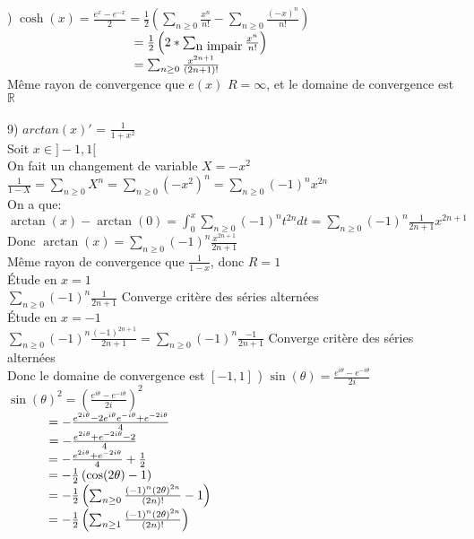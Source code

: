 \documentclass{article}
\newcommand\tab[1][1cm]{\hspace*{#1}}
\begin{document}
\newpage
{}) $\cosh(x) =  \frac{e^{x} - e^{-x}}{2} = \frac{1}{2} \left(\sum_{n \geq 0} \frac{x^n}{n!} - \sum_{n \geq 0} \frac{(-x)^n}{n!}\right)$\\
$\tab[3.55cm] = \frac{1}{2} \left(2 * \sum_{\mbox{n impair}} \frac{x^n}{n!} \right)$\\
$\tab[3.55cm] = \sum_{n \geq 0} \frac{x^{2n + 1}}{{(2n + 1)}!}$\\
Même rayon de convergence que $e(x)$ $R = \infty$, et le domaine de convergence est $\mathbb{R}$\\
\\
9) $arctan(x)'$ = $\frac{1}{1 + x^2}$\\
Soit $x \in ]-1, 1[$\\
On fait un changement de variable $X = -x^2$\\
$\frac{1}{1 - X} = \sum_{n \geq 0} X^n = \sum_{n \geq 0} (-x^2)^n = \sum_{n \geq 0} (-1)^n x^{2n}$\\
On a que: $\arctan(x) - \arctan(0) = \int_0^x \sum_{n \geq 0} (-1)^n t^{2n} dt = \sum_{n \geq 0} (-1)^n \frac{1}{2n + 1} x^{2n + 1}$\\
Donc $\arctan(x) = \sum_{n \geq 0} (-1)^n \frac{x^{2n + 1}}{2n + 1}$\\
Même rayon de convergence que $\frac{1}{1 - x}$, donc $R = 1$\\
Étude en $x = 1$\\
$\sum_{n \geq 0} (-1)^n \frac{1}{2n + 1}$ Converge critère des séries alternées\\
Étude en $x = -1$\\
$\sum_{n \geq 0} (-1)^n \frac{(-1)^{2n + 1}}{2n + 1} = \sum_{n \geq 0} (-1)^n \frac{-1}{2n + 1}$ Converge critère des séries alternées\\
Donc le domaine de convergence est $[-1, 1]$
\newpage
{})
$\sin(\theta) = \frac{e^{i \theta} - e^{-i \theta}}{2i}$\\
$\sin(\theta)^2 = \left(\frac{e^{i \theta} - e^{-i \theta}}{2i}\right)^2$\\
$\tab[1.15cm] = -\frac{e^{2i\theta} -2e^{i\theta}e^{-i\theta} + e^{-2i\theta}}{4}$\\
$\tab[1.15cm] = -\frac{e^{2i\theta} + e^{-2i\theta} - 2}{4}$\\
$\tab[1.15cm] = -\frac{e^{2i\theta} + e^{-2i\theta}}{4} + \frac{1}{2}$\\
$\tab[1.15cm] = -\frac{1}{2}\left(\cos(2\theta) - 1\right)$\\
$\tab[1.15cm] = -\frac{1}{2}\left(\sum_{n \geq 0} \frac{(-1)^{n}(2\theta)^{2n}}{(2n)!} - 1\right)$\\
$\tab[1.15cm] = -\frac{1}{2}\left(\sum_{n \geq 1} \frac{(-1)^{n}(2\theta)^{2n}}{(2n)!}\right)$\\
\end{document}
